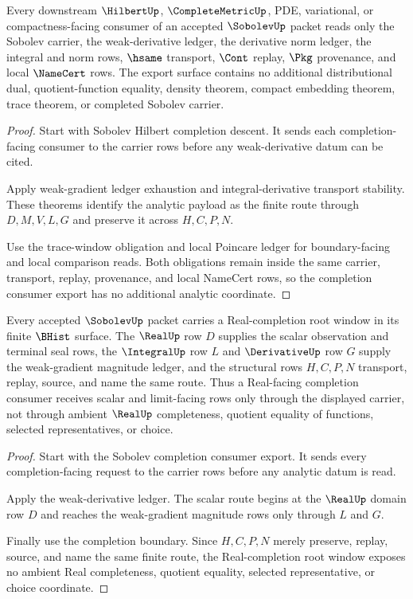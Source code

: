 \begin{theorem}
\label{thm:sobolev-completion-consumer-export}
Every downstream $\HilbertUp$, $\CompleteMetricUp$, PDE, variational, or compactness-facing consumer of an accepted $\SobolevUp$ packet reads only the Sobolev carrier, the weak-derivative ledger, the derivative norm ledger, the integral and norm rows, $\hsame$ transport, $\Cont$ replay, $\Pkg$ provenance, and local $\NameCert$ rows. The export surface contains no additional distributional dual, quotient-function equality, density theorem, compact embedding theorem, trace theorem, or completed Sobolev carrier.
\end{theorem}
\begin{proof}
Start with Sobolev Hilbert completion descent. It sends each completion-facing consumer to the carrier rows before any weak-derivative datum can be cited.

Apply weak-gradient ledger exhaustion and integral-derivative transport stability. These theorems identify the analytic payload as the finite route through $D,M,V,L,G$ and preserve it across $H,C,P,N$.

Use the trace-window obligation and local Poincare ledger for boundary-facing and local comparison reads. Both obligations remain inside the same carrier, transport, replay, provenance, and local NameCert rows, so the completion consumer export has no additional analytic coordinate.
\end{proof}

\begin{theorem}
\label{thm:sobolev-real-completion-root-window}
Every accepted $\SobolevUp$ packet carries a Real-completion root window in its finite $\BHist$ surface. The $\RealUp$ row $D$ supplies the scalar observation and terminal seal rows, the $\IntegralUp$ row $L$ and $\DerivativeUp$ row $G$ supply the weak-gradient magnitude ledger, and the structural rows $H,C,P,N$ transport, replay, source, and name the same route. Thus a Real-facing completion consumer receives scalar and limit-facing rows only through the displayed carrier, not through ambient $\RealUp$ completeness, quotient equality of functions, selected representatives, or choice.
\end{theorem}
\begin{proof}
Start with the Sobolev completion consumer export. It sends every completion-facing request to the carrier rows before any analytic datum is read.

Apply the weak-derivative ledger. The scalar route begins at the $\RealUp$ domain row $D$ and reaches the weak-gradient magnitude rows only through $L$ and $G$.

Finally use the completion boundary. Since $H,C,P,N$ merely preserve, replay, source, and name the same finite route, the Real-completion root window exposes no ambient Real completeness, quotient equality, selected representative, or choice coordinate.
\end{proof}

